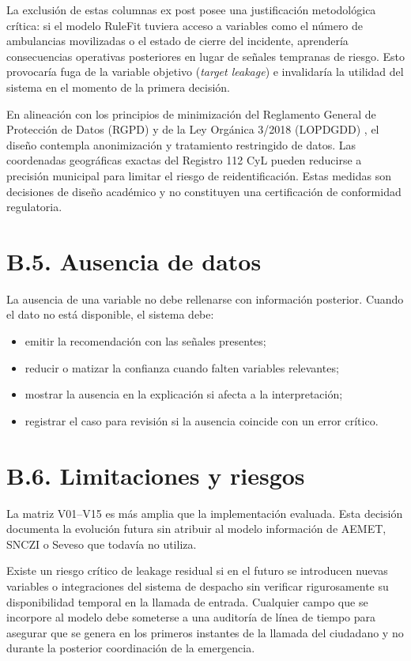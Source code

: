 La exclusión de estas columnas ex post posee una justificación metodológica crítica: si el modelo RuleFit tuviera acceso a variables como el número de ambulancias movilizadas o el estado de cierre del incidente, aprendería consecuencias operativas posteriores en lugar de señales tempranas de riesgo. Esto provocaría fuga de la variable objetivo (\textit{target leakage}) e invalidaría la utilidad del sistema en el momento de la primera decisión.

En alineación con los principios de minimización del Reglamento General de Protección de Datos (RGPD) \cite{RGPD} y de la Ley Orgánica 3/2018 (LOPDGDD) \cite{LOPDGDD}, el diseño contempla anonimización y tratamiento restringido de datos. Las coordenadas geográficas exactas del Registro 112 CyL pueden reducirse a precisión municipal para limitar el riesgo de reidentificación. Estas medidas son decisiones de diseño académico y no constituyen una certificación de conformidad regulatoria.

\section*{B.5. Ausencia de datos}

La ausencia de una variable no debe rellenarse con información posterior. Cuando el dato
no está disponible, el sistema debe:

\begin{itemize}
    \item emitir la recomendación con las señales presentes;
    \item reducir o matizar la confianza cuando falten variables relevantes;
    \item mostrar la ausencia en la explicación si afecta a la interpretación;
    \item registrar el caso para revisión si la ausencia coincide con un error crítico.
\end{itemize}

\section*{B.6. Limitaciones y riesgos}

La matriz V01--V15 es más amplia que la implementación evaluada. Esta decisión documenta la evolución futura sin atribuir al modelo información de AEMET, SNCZI o Seveso que todavía no utiliza.

Existe un riesgo crítico de leakage residual si en el futuro se introducen nuevas variables o integraciones del sistema de despacho sin verificar rigurosamente su disponibilidad temporal en la llamada de entrada. Cualquier campo que se incorpore al modelo debe someterse a una auditoría de línea de tiempo para asegurar que se genera en los primeros instantes de la llamada del ciudadano y no durante la posterior coordinación de la emergencia.
